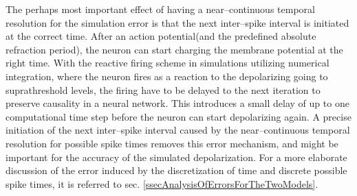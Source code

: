 


	The perhaps most important effect of having a near--continuous temporal resolution for the simulation error is that the next inter--spike interval is initiated at the correct time. %
	After an action potential(and the predefined absolute refraction period), the neuron can start charging the membrane potential at the right time. %
	With the reactive firing scheme in simulations utilizing numerical integration, where the neuron fires as a reaction to the depolarizing going to suprathreshold levels, 
		the firing have to be delayed to the next iteration to preserve causality in a neural network. %
	This  introduces a small delay of up to one computational time step before the neuron can start depolarizing again.
	A precise initiation of the next inter--spike interval caused by the near--continuous temporal resolution for possible spike times removes this error mechanism, and might be important for the accuracy of the simulated depolarization.
	For a more elaborate discussion of the error induced by the discretization of time and discrete possible spike times, it is referred to sec. \ref{ssecAnalysisOfErrorsForTheTwoModels}.

